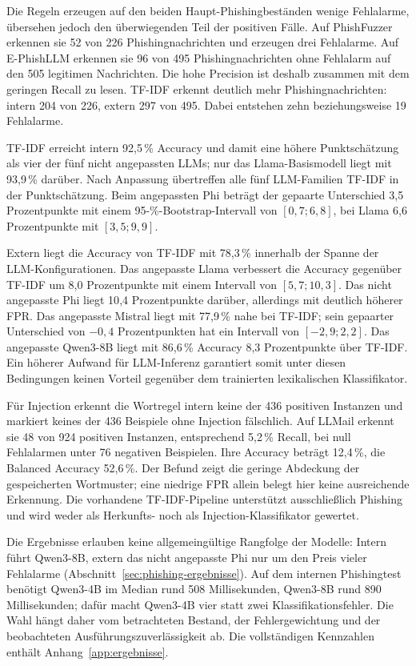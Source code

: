 \documentclass[12pt,twoside=false,a4paper,parskip]{scrbook}
\begin{document}
Die Regeln erzeugen auf den beiden Haupt-Phishingbeständen wenige Fehlalarme, übersehen jedoch den überwiegenden Teil der positiven Fälle. Auf PhishFuzzer erkennen sie 52 von 226 Phishingnachrichten und erzeugen drei Fehlalarme. Auf E-PhishLLM erkennen sie 96 von 495 Phishingnachrichten ohne Fehlalarm auf den 505 legitimen Nachrichten. Die hohe Precision ist deshalb zusammen mit dem geringen Recall zu lesen. TF-IDF erkennt deutlich mehr Phishingnachrichten: intern 204 von 226, extern 297 von 495. Dabei entstehen zehn beziehungsweise 19 Fehlalarme.

TF-IDF erreicht intern 92{,}5\,\% Accuracy und damit eine höhere Punktschätzung als vier der fünf nicht angepassten LLMs; nur das Llama-Basismodell liegt mit 93{,}9\,\% darüber. Nach Anpassung übertreffen alle fünf LLM-Familien TF-IDF in der Punktschätzung. Beim angepassten Phi beträgt der gepaarte Unterschied 3{,}5 Prozentpunkte mit einem 95-\%-Bootstrap-Intervall von $[0{,}7;6{,}8]$, bei Llama 6{,}6 Prozentpunkte mit $[3{,}5;9{,}9]$.

Extern liegt die Accuracy von TF-IDF mit 78{,}3\,\% innerhalb der Spanne der LLM-Konfigurationen. Das angepasste Llama verbessert die Accuracy gegenüber TF-IDF um 8{,}0 Prozentpunkte mit einem Intervall von $[5{,}7;10{,}3]$. Das nicht angepasste Phi liegt 10{,}4 Prozentpunkte darüber, allerdings mit deutlich höherer FPR. Das angepasste Mistral liegt mit 77{,}9\,\% nahe bei TF-IDF; sein gepaarter Unterschied von $-0{,}4$ Prozentpunkten hat ein Intervall von $[-2{,}9;2{,}2]$. Das angepasste Qwen3-8B liegt mit 86{,}6\,\% Accuracy 8{,}3 Prozentpunkte über TF-IDF. Ein höherer Aufwand für LLM-Inferenz garantiert somit unter diesen Bedingungen keinen Vorteil gegenüber dem trainierten lexikalischen Klassifikator.

Für Injection erkennt die Wortregel intern keine der 436 positiven Instanzen und markiert keines der 436 Beispiele ohne Injection fälschlich. Auf LLMail erkennt sie 48 von 924 positiven Instanzen, entsprechend 5{,}2\,\% Recall, bei null Fehlalarmen unter 76 negativen Beispielen. Ihre Accuracy beträgt 12{,}4\,\%, die Balanced Accuracy 52{,}6\,\%. Der Befund zeigt die geringe Abdeckung der gespeicherten Wortmuster; eine niedrige FPR allein belegt hier keine ausreichende Erkennung. Die vorhandene TF-IDF-Pipeline unterstützt ausschließlich Phishing und wird weder als Herkunfts- noch als Injection-Klassifikator gewertet.

Die Ergebnisse erlauben keine allgemeingültige Rangfolge der Modelle: Intern führt Qwen3-8B, extern das nicht angepasste Phi nur um den Preis vieler Fehlalarme (Abschnitt~\ref{sec:phishing-ergebnisse}). Auf dem internen Phishingtest benötigt Qwen3-4B im Median rund 508 Millisekunden, Qwen3-8B rund 890 Millisekunden; dafür macht Qwen3-4B vier statt zwei Klassifikationsfehler. Die Wahl hängt daher vom betrachteten Bestand, der Fehlergewichtung und der beobachteten Ausführungszuverlässigkeit ab. Die vollständigen Kennzahlen enthält Anhang~\ref{app:ergebnisse}.
\end{document}
